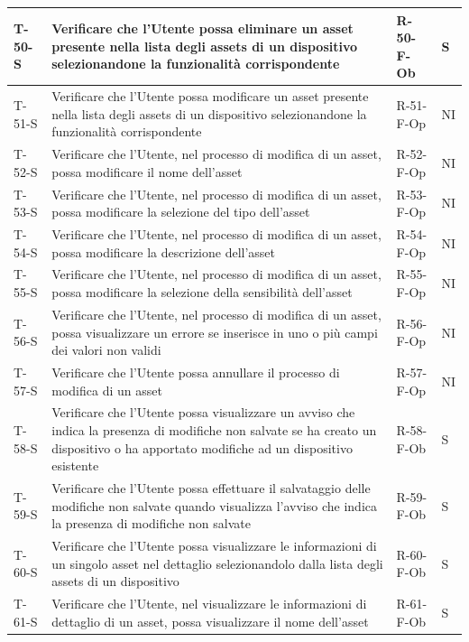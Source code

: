 \documentclass[a4paper,12pt]{article}
\begin{document}
{{\begin{longtable}{|p{}|p{}|p{}|p{}|}
                T-50-S & Verificare che l'Utente possa eliminare un asset presente nella lista degli assets di un dispositivo selezionandone la funzionalità corrispondente & R-50-F-Ob & S \\ \hline
                T-51-S & Verificare che l'Utente possa modificare un asset presente nella lista degli assets di un dispositivo selezionandone la funzionalità corrispondente & R-51-F-Op & NI \\ \hline
                T-52-S & Verificare che l'Utente, nel processo di modifica di un asset, possa modificare il nome dell'asset & R-52-F-Op & NI \\ \hline
                T-53-S & Verificare che l'Utente, nel processo di modifica di un asset, possa modificare la selezione del tipo dell'asset & R-53-F-Op & NI \\ \hline
                T-54-S & Verificare che l'Utente, nel processo di modifica di un asset, possa modificare la descrizione dell'asset & R-54-F-Op & NI \\ \hline
                T-55-S & Verificare che l'Utente, nel processo di modifica di un asset, possa modificare la selezione della sensibilità dell'asset & R-55-F-Op & NI \\ \hline
                T-56-S & Verificare che l'Utente, nel processo di modifica di un asset, possa visualizzare un errore se inserisce in uno o più campi dei valori non validi & R-56-F-Op & NI \\ \hline
                T-57-S & Verificare che l'Utente possa annullare il processo di modifica di un asset & R-57-F-Op & NI \\ \hline
                T-58-S & Verificare che l'Utente possa visualizzare un avviso che indica la presenza di modifiche non salvate se ha creato un dispositivo o ha apportato modifiche ad un dispositivo esistente & R-58-F-Ob & S \\ \hline
                T-59-S & Verificare che l'Utente possa effettuare il salvataggio delle modifiche non salvate quando visualizza l'avviso che indica la presenza di modifiche non salvate & R-59-F-Ob & S \\ \hline
                T-60-S & Verificare che l'Utente possa visualizzare le informazioni di un singolo asset nel dettaglio selezionandolo dalla lista degli assets di un dispositivo & R-60-F-Ob & S \\ \hline
                T-61-S & Verificare che l'Utente, nel visualizzare le informazioni di dettaglio di un asset, possa visualizzare il nome dell'asset & R-61-F-Ob & S \\ \hline

\end{longtable}}}
\end{document}
